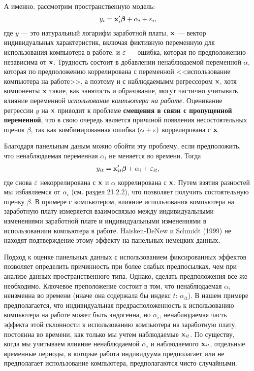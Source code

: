  А именно, рассмотрим пространственную модель:
\begin{align}
y_i=\mathbf{x}'_i \bm\beta+\alpha_i +\varepsilon_i,
\nonumber
\end{align}
где $y$ --- это натуральный логарифм заработной платы, $\mathbf{x}$ --- вектор индивидуальных характеристик, включая фиктивную переменную для использования компьютера в работе, и $\varepsilon$ --- ошибка, которая по предположению независима от $\mathbf{x}$. Трудность состоит в добавлении ненаблюдаемой переменной $\alpha$, которая по предположению коррелирована с переменной <<использование компьютера на работе>>, а поэтому и с наблюдаемымм регрессором $\mathbf{x}$, хотя компоненты $\mathbf{x}$ такие, как занятость и образование, могут частично учитывать влияние переменной {\it использование компьютера на работе}. Оценивание регрессии $y$ на $\mathbf{x}$ приводит к проблеме \textbf{смещения в связи с пропущенной переменной}, что в свою очередь является причиной появления несостоятельных оценок $\beta$, так как комбинированная ошибка $(\alpha + \varepsilon)$ коррелирована с $\mathbf{x}$.

Благодаря панельным даным можно обойти эту проблему, если предположить, что ненаблюдаемая переменная $\alpha_i$ не меняется во времени. Тогда 
\begin{align}
y_{it}=\mathbf{x}'_{it} \bm\beta+\alpha_i +\varepsilon_{it},
\nonumber
\end{align}
где снова $\varepsilon$  некоррелирована с $\mathbf{x}$ и $\alpha$ коррелирована с $\mathbf{x}$. Путем взятия разностей мы избавляемся от $\alpha_i$ (см. раздел 21.2.2), что позволяет получить состоятельную оценку $\beta$. В примере с компьютером, влияние использования компьютера на заработную плату измеряется взаимосвязью между индивидуальными изменениями заработной плате и индивидуальными изменениями в использованиии компьютера в работе. Haisken-DeNew и Schmidt (1999) не находят подтверждение этому эффекту на панельных немецких данных.

Подход к оценке панельных данных с использованием фиксированных эффектов позволяет определить причинность при более слабых предпосылках, чем при анализе данных пространственного типа. Однако, сделать предположения все же необходимо. Ключевое преположение состоит в том, что ненаблюдаемая $\alpha_i$ неизменна во времени (иначе она содержала бы индекс $t$: $\alpha_{it}$). В нашем примере предполагается, что индивидуальная предрасположенность к использованию компьютера на работе может быть эндогенна, но $\alpha_i$, ненаблюдаемая часть эффекта этой склонности к использованию компьютера  на заработную плату, постоянна во времени, как только мы учтем наблюдаемые  $\mathbf{x}_{it}$. По существу, когда мы учитываем влияние ненаблюдаемой $\alpha_i$ и наблюдаемого $\mathbf{x}_{it}$, отдельные временные периоды, в которые работа индивидуума предполагает или не предполагает использование компьютера, предполагаются чисто случайными.


